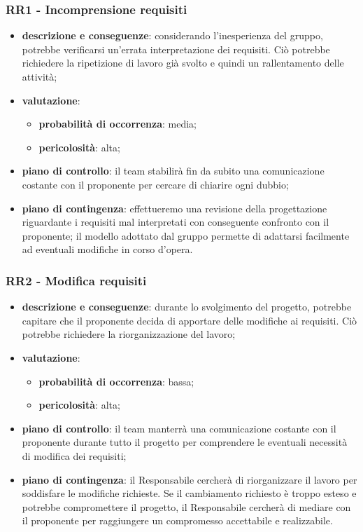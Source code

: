     \subsubsection{RR1 - Incomprensione requisiti} \label{sec:RR1}
        \begin{itemize}
            \item \textbf{descrizione e conseguenze}: considerando l'inesperienza del gruppo, potrebbe verificarsi un'errata interpretazione dei requisiti. Ciò potrebbe richiedere la ripetizione di lavoro già svolto e quindi un rallentamento delle attività;
            \item \textbf{valutazione}:
            \begin{itemize} 
                \item \textbf{probabilità di occorrenza}: media;
                \item \textbf{pericolosità}: alta;
            \end{itemize}
            \item \textbf{piano di controllo}: il team stabilirà fin da subito una comunicazione costante con il proponente per cercare di chiarire ogni dubbio;
            \item \textbf{piano di contingenza}: effettueremo una revisione della progettazione riguardante i requisiti mal interpretati con conseguente confronto con il proponente; il modello adottato dal gruppo permette di adattarsi facilmente ad eventuali modifiche in corso d'opera.
        \end{itemize}
        
    \subsubsection{RR2 - Modifica requisiti} \label{sec:RR2}
        \begin{itemize}
            \item \textbf{descrizione e conseguenze}: durante lo svolgimento del progetto, potrebbe capitare che il proponente decida di apportare delle modifiche ai requisiti. Ciò potrebbe richiedere la riorganizzazione del lavoro;
            \item \textbf{valutazione}:
            \begin{itemize} 
                \item \textbf{probabilità di occorrenza}: bassa;
                \item \textbf{pericolosità}: alta;
            \end{itemize}
            \item \textbf{piano di controllo}: il team manterrà una comunicazione costante con il proponente durante tutto il progetto per comprendere le eventuali necessità di modifica dei requisiti;
            \item \textbf{piano di contingenza}: il Responsabile cercherà di riorganizzare il lavoro per soddisfare le modifiche richieste. Se il cambiamento richiesto è troppo esteso e potrebbe compromettere il progetto, il Responsabile cercherà di mediare con il proponente per raggiungere un compromesso accettabile e realizzabile.
        \end{itemize}




